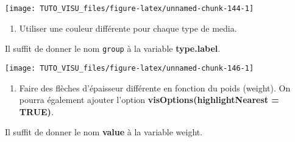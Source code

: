 \documentclass[]{book}
\newenvironment{Shaded}{\begin{snugshade}}{\end{snugshade}}
\newcommand{\DataTypeTok}[1]{\textcolor[rgb]{0.13,0.29,0.53}{#1}}
\newcommand{\DecValTok}[1]{\textcolor[rgb]{0.00,0.00,0.81}{#1}}
\newcommand{\KeywordTok}[1]{\textcolor[rgb]{0.13,0.29,0.53}{\textbf{#1}}}
\newcommand{\NormalTok}[1]{#1}
\newcommand{\OperatorTok}[1]{\textcolor[rgb]{0.81,0.36,0.00}{\textbf{#1}}}
\newcommand{\OtherTok}[1]{\textcolor[rgb]{0.56,0.35,0.01}{#1}}
\newcommand{\StringTok}[1]{\textcolor[rgb]{0.31,0.60,0.02}{#1}}
\providecommand{\tightlist}{%
  \setlength{\itemsep}{0pt}\setlength{\parskip}{0pt}}
\theoremstyle{definition}
\theoremstyle{definition}
\theoremstyle{definition}
\theoremstyle{remark}
\begin{document}
\begin{center}\texttt{[image: TUTO\_VISU\_files/figure-latex/unnamed-chunk-144-1]} \end{center}

\begin{enumerate}
\def\labelenumi{\arabic{enumi}.}
\setcounter{enumi}{2}
\tightlist
\item
  Utiliser une couleur différente pour chaque type de media.
\end{enumerate}

Il suffit de donner le nom \texttt{group} à la variable \textbf{type.label}.

\begin{Shaded}
\end{Shaded}

\begin{center}\texttt{[image: TUTO\_VISU\_files/figure-latex/unnamed-chunk-146-1]} \end{center}

\begin{enumerate}
\def\labelenumi{\arabic{enumi}.}
\setcounter{enumi}{3}
\tightlist
\item
  Faire des flèches d'épaisseur différente en fonction du poids (weight). On pourra également ajouter l'option \textbf{visOptions(highlightNearest = TRUE)}.
\end{enumerate}

Il suffit de donner le nom \textbf{value} à la variable weight.

\begin{Shaded}
\end{Shaded}
\end{document}
